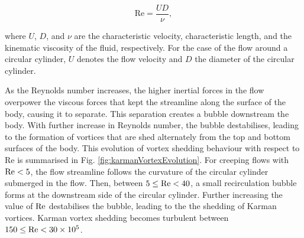 \documentclass[oneside]{utmthesis}
\begin{document}
\begin{equation}
  \text{Re} = \frac{UD}{\nu},
  \label{eq:reyNum}
\end{equation}

\noindent where $U$, $D$, and $\nu$ are the characteristic velocity, characteristic length, and the kinematic viscosity of the fluid, respectively. For the case of the flow around a circular cylinder, $U$ denotes the flow velocity and $D$ the diameter of the circular cylinder.

As the Reynolds number increases, the higher inertial forces in the flow overpower the viscous forces that kept the streamline along the surface of the body, causing it to separate. This separation creates a bubble downstream the body. With further increase in Reynolds number, the bubble destabilises, leading to the formation of vortices that are shed alternately from the top and bottom surfaces of the body. This evolution of vortex shedding behaviour with respect to Re is summarised in Fig. \ref{fig:karmanVortexEvolution}. For creeping flows with $\text{Re} < 5$, the flow streamline follows the curvature of the circular cylinder submerged in the flow. Then, between $5 \leq \text{Re} < 40$, a small recirculation bubble forms at the downstream side of the circular cylinder. Further increasing the value of $\text{Re}$ destabilises the bubble, leading to the the shedding of Karman vortices. Karman vortex shedding becomes turbulent between $150 \leq \text{Re} < 30 \times 10^{5}$.
\end{document}
